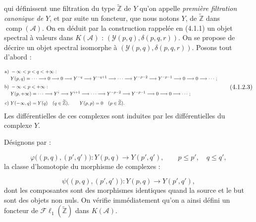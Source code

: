 \clearpage
{}%
\begingroup\small\setlength{\parskip}{0pt}\setlength{\emergencystretch}{1.5em}
\setlength{\abovedisplayskip}{4pt plus 2pt minus 2pt}%
\setlength{\belowdisplayskip}{4pt plus 2pt minus 2pt}%

qui définissent une filtration du type $\widetilde{\mathbb Z}$ de $Y$
qu'on appelle \emph{première filtration canonique de $Y$}, et par suite un
foncteur, que nous notons $Y$, de $\widetilde{\mathbb Z}$ dans
$\operatorname{comp}(\mathcal A)$. On en déduit par la construction
rappelée en (4.1.1) un objet spectral à valeurs dans $K(\mathcal A)$ :
$(\mathcal Y(p,q),\delta(p,q,r))$. On se propose de décrire un objet
spectral isomorphe à $(\mathcal Y(p,q),\delta(p,q,r))$. Posons tout d'abord :

\begin{equation}
\resizebox{0.98\textwidth}{!}{%
$\displaystyle
\begin{aligned}
\text{a) }& -\infty<p<q<+\infty:\\[-2pt]
&Y(p,q)=\cdots\longrightarrow0\longrightarrow0\longrightarrow Y^{-q}
\longrightarrow Y^{-q+1}\longrightarrow\cdots\longrightarrow Y^{-p-2}
\longrightarrow Y^{-p-1}\longrightarrow0\longrightarrow0
\longrightarrow\cdots;\\[2pt]
\text{b) }& -\infty<p<+\infty:\\[-2pt]
&Y(p,+\infty)=\cdots\longrightarrow Y^i\longrightarrow Y^{i+1}
\longrightarrow\cdots\longrightarrow Y^{-p-2}\longrightarrow Y^{-p-1}
\longrightarrow0\longrightarrow0\longrightarrow\cdots;\\[2pt]
\text{c) }&Y(-\infty,q)=Y(q)\quad(q\in\widetilde{\mathbb Z}),\qquad
Y(p,p)=0\quad(p\in\widetilde{\mathbb Z}).
\end{aligned}$%
}
\tag{4.1.2.3}
\end{equation}
Les différentielles de ces complexes sont induites par les différentielles
du complexe $Y$.

Désignons par :

\begin{equation}
\varphi\bigl((p,q),(p',q')\bigr)\colon
Y(p,q)\longrightarrow Y(p',q'),\qquad p\leq p',\quad q\leq q',
\tag{4.1.2.4}
\end{equation}
la classe d'homotopie du morphisme de complexes :

\begin{equation}
\psi\bigl((p,q),(p',q')\bigr)\colon
Y(p,q)\longrightarrow Y(p',q'),
\tag{4.1.2.5}
\end{equation}
dont les composantes sont des morphismes identiques quand la source et le
but sont des objets non nuls. On vérifie immédiatement qu'on a ainsi défini
un foncteur de $\mathcal{F}\ell_1(\widetilde{\mathbb Z})$ dans
$K(\mathcal A)$.

